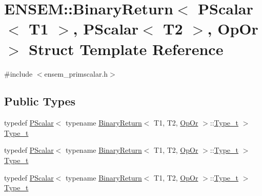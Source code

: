 \hypertarget{structENSEM_1_1BinaryReturn_3_01PScalar_3_01T1_01_4_00_01PScalar_3_01T2_01_4_00_01OpOr_01_4}{}\section{E\+N\+S\+EM\+:\+:Binary\+Return$<$ P\+Scalar$<$ T1 $>$, P\+Scalar$<$ T2 $>$, Op\+Or $>$ Struct Template Reference}
\label{structENSEM_1_1BinaryReturn_3_01PScalar_3_01T1_01_4_00_01PScalar_3_01T2_01_4_00_01OpOr_01_4}


{\ttfamily \#include $<$ensem\+\_\+primscalar.\+h$>$}

\subsection*{Public Types}
\begin{DoxyCompactItemize}
\item 
typedef \mbox{\hyperlink{classENSEM_1_1PScalar}{P\+Scalar}}$<$ typename \mbox{\hyperlink{structENSEM_1_1BinaryReturn}{Binary\+Return}}$<$ T1, T2, \mbox{\hyperlink{structENSEM_1_1OpOr}{Op\+Or}} $>$\+::\mbox{\hyperlink{structENSEM_1_1BinaryReturn_3_01PScalar_3_01T1_01_4_00_01PScalar_3_01T2_01_4_00_01OpOr_01_4_a20c035d4e3497954d3af72c7e41d7201}{Type\+\_\+t}} $>$ \mbox{\hyperlink{structENSEM_1_1BinaryReturn_3_01PScalar_3_01T1_01_4_00_01PScalar_3_01T2_01_4_00_01OpOr_01_4_a20c035d4e3497954d3af72c7e41d7201}{Type\+\_\+t}}
\item 
typedef \mbox{\hyperlink{classENSEM_1_1PScalar}{P\+Scalar}}$<$ typename \mbox{\hyperlink{structENSEM_1_1BinaryReturn}{Binary\+Return}}$<$ T1, T2, \mbox{\hyperlink{structENSEM_1_1OpOr}{Op\+Or}} $>$\+::\mbox{\hyperlink{structENSEM_1_1BinaryReturn_3_01PScalar_3_01T1_01_4_00_01PScalar_3_01T2_01_4_00_01OpOr_01_4_a20c035d4e3497954d3af72c7e41d7201}{Type\+\_\+t}} $>$ \mbox{\hyperlink{structENSEM_1_1BinaryReturn_3_01PScalar_3_01T1_01_4_00_01PScalar_3_01T2_01_4_00_01OpOr_01_4_a20c035d4e3497954d3af72c7e41d7201}{Type\+\_\+t}}
\item 
typedef \mbox{\hyperlink{classENSEM_1_1PScalar}{P\+Scalar}}$<$ typename \mbox{\hyperlink{structENSEM_1_1BinaryReturn}{Binary\+Return}}$<$ T1, T2, \mbox{\hyperlink{structENSEM_1_1OpOr}{Op\+Or}} $>$\+::\mbox{\hyperlink{structENSEM_1_1BinaryReturn_3_01PScalar_3_01T1_01_4_00_01PScalar_3_01T2_01_4_00_01OpOr_01_4_a20c035d4e3497954d3af72c7e41d7201}{Type\+\_\+t}} $>$ \mbox{\hyperlink{structENSEM_1_1BinaryReturn_3_01PScalar_3_01T1_01_4_00_01PScalar_3_01T2_01_4_00_01OpOr_01_4_a20c035d4e3497954d3af72c7e41d7201}{Type\+\_\+t}}
\end{DoxyCompactItemize}


